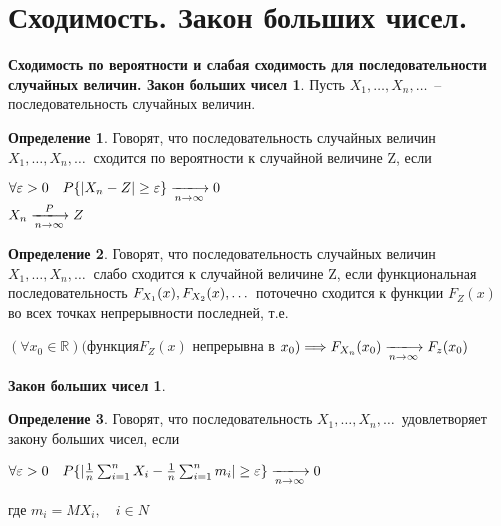 \documentclass[a4paper, 12pt]{article}
\theoremstyle{definition}
\newtheorem{definition}{Определение}[section]
\theoremstyle{leads}
\theoremstyle{example}
\newcommand{\infseq}[3]{%
	\ensuremath{#1_#2, \dots, #1_#3, \dots}\ }
\newcommand{\infseqX}{%
	\infseq{X}{1}{n}}
\begin{document}
\section{Сходимость. Закон больших чисел.}
\newtheorem*{sxod}{Сходимость по вероятности и слабая сходимость для последовательности случайных величин. Закон больших чисел}
\begin{sxod}
	Пусть  \infseqX -- последовательность случайных величин.
	\begin{definition}
		Говорят, что последовательность случайных величин $\infseqX$ сходится по вероятности к случайной величине Z, если\newline
		\begin{center}
			\centering
			$\forall \varepsilon > 0 \quad P\{|X_n - Z| \geq \varepsilon\} \xlongrightarrow[n \rightarrow \infty]{} 0$\\
			$X_n \xlongrightarrow [n \rightarrow \infty]{P} Z$
		\end{center}
	\end{definition}	
	\begin{definition}
		Говорят, что последовательность случайных величин $\infseqX$ слабо сходится к случайной величине Z, если функциональная последовательность $F_{X_1}(x),\newline F_{X_2}(x), \dots$ поточечно сходится к функции $F_{Z}(x)$ во всех точках непрерывности последней, т.е.
		\begin{center}
			\centering
			$(\forall x_0 \in \mathbb{R})(функция F_{Z}(x)$ непрерывна в $x_{0}) \Longrightarrow F_{X_n}(x_0) \xlongrightarrow[n\rightarrow \infty]{} F_z(x_0)$
		\end{center}
	\end{definition}
\end{sxod}
\newtheorem*{bignumbers}{Закон больших чисел}
\begin{bignumbers}
    \begin{definition}
    	Говорят, что последовательность \infseqX удовлетворяет закону больших чисел, если 
    	\begin{center}
    		\centering
    		$\forall \varepsilon > 0 \quad P\{|\frac{1}{n}\sum_{i = 1}^{n}X_i - \frac{1}{n}\sum_{i=1}^{n}m_i|\geq \varepsilon\} \xlongrightarrow[n\rightarrow \infty]{} 0$
    	\end{center}
    где $m_i = MX_i,\quad i \in N$
    \end{definition}
\end{bignumbers}
\newtheorem*{bcheb}{Закон больших чисел в форме Чебышева}
\end{document}
